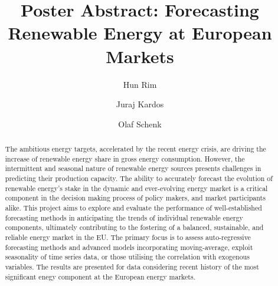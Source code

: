 \documentclass[acmtog]{acmart}
\begin{document}
\title{Poster Abstract: Forecasting Renewable Energy at European  Markets
}

\author{Hun Rim}
\author{Juraj Kardos}
\author{Olaf Schenk}
\authornotemark[1]

\begin{abstract}
The ambitious energy targets, accelerated by the recent energy crisis, are driving the increase of renewable energy share in gross energy consumption.
However, the intermittent and seasonal nature of renewable energy sources presents challenges in predicting their production capacity. The ability to accurately forecast the evolution of renewable energy’s stake in the dynamic and ever-evolving energy market is a critical component in the decision making process of policy makers, and market participants alike. This project aims to explore and evaluate the performance of well-established forecasting methods in anticipating the trends of individual renewable energy components, ultimately contributing to the fostering of a balanced, sustainable, and reliable energy market in the EU. 
%
The primary focus is to assess auto-regressive forecasting methods and advanced models incorporating moving-average, exploit seasonality of time series data, or those utilising the correlation with exogenous variables. The results are presented for data considering recent history of the most significant enegy component at the European energy markets.

\end{abstract}
\end{document}
